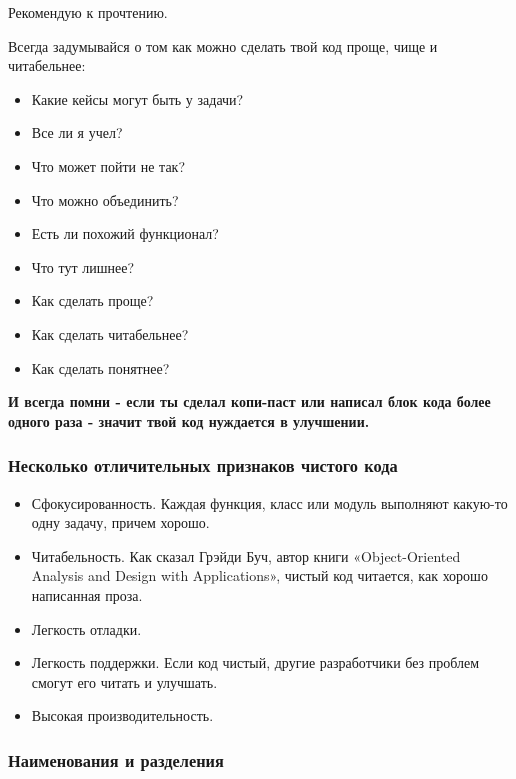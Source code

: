 Рекомендую к прочтению.

Всегда задумывайся о том как можно сделать твой код проще, чище и читабельнее:

\begin{itemize}
	\item Какие кейсы могут быть у задачи?
	\item Все ли я учел?
	\item Что может пойти не так?
	\item Что можно объединить?
	\item Есть ли похожий функционал?
	\item Что тут лишнее?
	\item Как сделать проще?
	\item Как сделать читабельнее?
	\item Как сделать понятнее?
\end{itemize}

\textbf{И всегда помни - если ты сделал копи-паст или написал блок кода более одного раза - значит твой код нуждается в улучшении.}

\subsubsection{Несколько отличительных признаков чистого кода}

\begin{itemize}
	\item Сфокусированность. Каждая функция, класс или модуль выполняют какую-то одну задачу, причем хорошо.
	\item Читабельность. Как сказал Грэйди Буч, автор книги «Object-Oriented Analysis and Design with Applications», чистый код читается, как хорошо написанная проза.
	\item Легкость отладки.
	\item Легкость поддержки. Если код чистый, другие разработчики без проблем смогут его читать и улучшать.
	\item Высокая производительность.
\end{itemize}

\subsubsection{Наименования и разделения}

